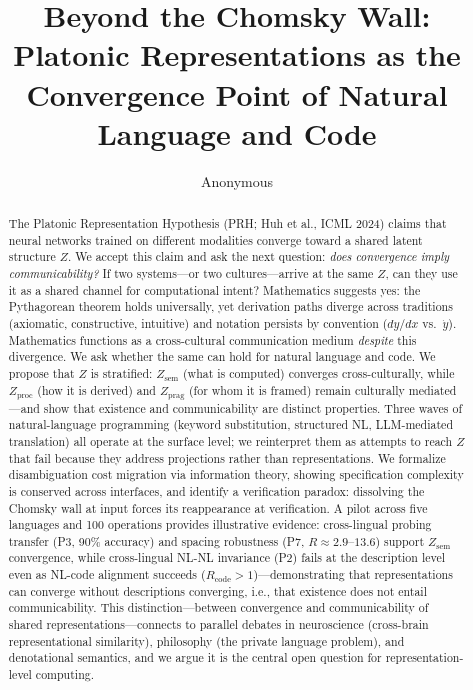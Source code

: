 \documentclass{article}
\title{Beyond the Chomsky Wall: Platonic Representations as the\\Convergence Point of Natural Language and Code}
\author{Anonymous}
\date{}
\theoremstyle{definition}
\newcommand{\Zsem}{Z_{\text{sem}}}
\newcommand{\Zproc}{Z_{\text{proc}}}
\newcommand{\Zprag}{Z_{\text{prag}}}
\begin{document}
\maketitle

\begin{abstract}
The Platonic Representation Hypothesis (PRH; Huh et al., ICML 2024) claims that neural networks trained on different modalities converge toward a shared latent structure $Z$. We accept this claim and ask the next question: \emph{does convergence imply communicability?} If two systems---or two cultures---arrive at the same $Z$, can they use it as a shared channel for computational intent? Mathematics suggests yes: the Pythagorean theorem holds universally, yet derivation paths diverge across traditions (axiomatic, constructive, intuitive) and notation persists by convention ($dy/dx$ vs.\ $\dot{y}$). Mathematics functions as a cross-cultural communication medium \emph{despite} this divergence. We ask whether the same can hold for natural language and code. We propose that $Z$ is stratified: $\Zsem$ (what is computed) converges cross-culturally, while $\Zproc$ (how it is derived) and $\Zprag$ (for whom it is framed) remain culturally mediated---and show that existence and communicability are distinct properties. Three waves of natural-language programming (keyword substitution, structured NL, LLM-mediated translation) all operate at the surface level; we reinterpret them as attempts to reach $Z$ that fail because they address projections rather than representations. We formalize disambiguation cost migration via information theory, showing specification complexity is conserved across interfaces, and identify a verification paradox: dissolving the Chomsky wall at input forces its reappearance at verification. A pilot across five languages and 100 operations provides illustrative evidence: cross-lingual probing transfer (P3, 90\% accuracy) and spacing robustness (P7, $R \approx 2.9$--$13.6$) support $\Zsem$ convergence, while cross-lingual NL-NL invariance (P2) fails at the description level even as NL-code alignment succeeds ($R_{\text{code}} > 1$)---demonstrating that representations can converge without descriptions converging, i.e., that existence does not entail communicability. This distinction---between convergence and communicability of shared representations---connects to parallel debates in neuroscience (cross-brain representational similarity), philosophy (the private language problem), and denotational semantics, and we argue it is the central open question for representation-level computing.
\end{abstract}
\end{document}
